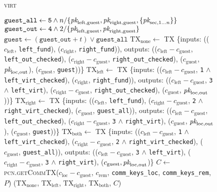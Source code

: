 \begin{figure}[H]
\begin{processbox}{\textsc{virt}}
\begin{algorithmic}[1]
        \State $\texttt{guest\_all} \gets \texttt{5} \wedge
        n/\{\textit{pk}_{\mathrm{left}, \mathrm{guest}}, \textit{pk}_{\mathrm{right},
        \mathrm{guest}}, \{\textit{pk}_{\mathrm{sec}, 1 \dots n}\}\}$
        \State $\texttt{guest\_out} \gets \texttt{4} \wedge
        2/\{\textit{pk}_{\mathrm{left}, \mathrm{guest}}, \textit{pk}_{\mathrm{right},
        \mathrm{guest}}\}$
        \State $\texttt{guest} \gets (\texttt{guest\_out} + t) \vee
        \texttt{guest\_all}$
        \State $\mathrm{TX}_{\mathrm{none}} \gets$ TX \{inputs:
        (($c_{\mathrm{left}}$, \texttt{left\_fund}), ($c_{\mathrm{right}}$,
        \texttt{right\_fund})), outputs: (($c_{\mathrm{left}} -
        c_{\mathrm{guest}}$, \texttt{left\_out\_checked}), ($c_{\mathrm{right}}
        - c_{\mathrm{guest}}$, \texttt{right\_out\_checked}),
        ($c_{\mathrm{guest}}$, $\textit{pk}_{\mathrm{loc}, \mathrm{out}}$),
        ($c_{\mathrm{guest}}$, \texttt{guest}))\}
        \State $\mathrm{TX}_{\mathrm{left}} \gets$ TX \{inputs:
        (($c_{\mathrm{left}} - c_{\mathrm{guest}}$, \texttt{1} $\wedge$
        \texttt{left\_virt\_checked}), ($c_{\mathrm{right}}$,
        \texttt{right\_fund})), outputs: (($c_{\mathrm{left}} -
        c_{\mathrm{guest}}$, \texttt{3} $\wedge$ \texttt{left\_virt}),
        ($c_{\mathrm{right}} - c_{\mathrm{guest}}$,
        \texttt{right\_out\_checked}), ($c_{\mathrm{guest}}$, $\textit{pk}_{\mathrm{loc},
        \mathrm{out}}$))\}
        \State $\mathrm{TX}_{\mathrm{right}} \gets$ TX \{inputs:
        (($c_{\mathrm{left}}$, \texttt{left\_fund}), ($c_{\mathrm{right}} -
        c_{\mathrm{guest}}$, \texttt{2} $\wedge$ \texttt{right\_virt\_checked}),
        ($c_{\mathrm{guest}}$, \texttt{guest\_all})),
        outputs: (($c_{\mathrm{left}} - c_{\mathrm{guest}}$,
        \texttt{left\_out\_checked}), ($c_{\mathrm{right}} -
        c_{\mathrm{guest}}$, \texttt{3} $\wedge$ \texttt{right\_virt}),
        ($c_{\mathrm{guest}}$, $\textit{pk}_{\mathrm{loc}, \mathrm{out}}$),
        ($c_{\mathrm{guest}}$, \texttt{guest}))\}
        \State $\mathrm{TX}_{\mathrm{both}} \gets$ TX \{inputs:
        (($c_{\mathrm{left}} - c_{\mathrm{guest}}$, \texttt{1} $\wedge$
        \texttt{left\_virt\_checked}), ($c_{\mathrm{right}} -
        c_{\mathrm{guest}}$, \texttt{2} $\wedge$ \texttt{right\_virt\_checked}),
        ($c_{\mathrm{guest}}$, \texttt{guest\_all})), outputs: (($c_{\mathrm{left}} -
        c_{\mathrm{guest}}$, \texttt{3} $\wedge$ \texttt{left\_virt}),
        ($c_{\mathrm{right}} - c_{\mathrm{guest}}$, \texttt{3} $\wedge$
        \texttt{right\_virt}), ($c_{\mathrm{guest}}, \textit{pk}_{\mathrm{loc},
        \mathrm{out}}$)\}
        \State $C \gets$ \textsc{pcn.getCommTX}($c_{\mathrm{loc}} -
        c_{\mathrm{guest}}$, $c_{\mathrm{rem}}$, \texttt{comm\_keys\_loc},
        \texttt{comm\_keys\_rem}, $P$)
        \State \Return ($\mathrm{TX}_{\mathrm{none}}$,
        $\mathrm{TX}_{\mathrm{left}}$, $\mathrm{TX}_{\mathrm{right}}$,
        $\mathrm{TX}_{\mathrm{both}}$, $C$)
      \EndIndent
    \end{algorithmic}
  \end{processbox}
  \caption{}
  \label{code:virtual-layer:mid-txs}
\end{figure}

